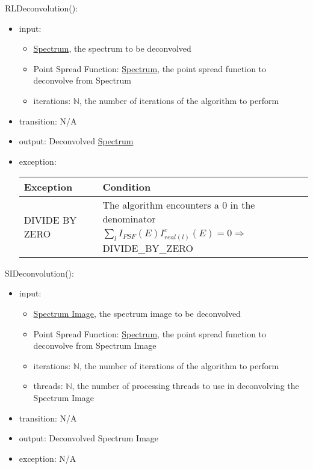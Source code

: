 \documentclass[12pt, titlepage]{article}
\begin{document}
\noindent RLDeconvolution():
\begin{itemize}
    \item input: 
        \begin{itemize}
            \item \hyperref[Mod:Spectrum]{Spectrum}, the spectrum to be deconvolved
            \item Point Spread Function: \hyperref[Mod:Spectrum]{Spectrum}, the point spread function to deconvolve from Spectrum
            \item iterations: $\mathbb{N}$, the number of iterations of the algorithm to perform
        \end{itemize}
    \item transition: N/A
    \item output: Deconvolved \hyperref[Mod:Spectrum]{Spectrum}
    \item exception:
    \begin{center}
        \begin{tabular}{p{3.5cm} p{12cm}}
            \toprule[0.15em]
            \textbf{Exception} & \textbf{Condition}\\
            \midrule[0.1em]
            \multirow{2}{0.25\textwidth}{DIVIDE BY ZERO} & The algorithm encounters a 0 in the denominator\\ 
            & $\sum_l{I_{PSF}(E)I_{real(l)}^c(E)} = 0 \Rightarrow$ DIVIDE\_BY\_ZERO\\ 
            \bottomrule[0.15em]
        \end{tabular}
    \end{center}
\end{itemize}

\noindent SIDeconvolution():
\begin{itemize}
    \item input: 
    \begin{itemize}
        \item \hyperref[Mod:SI]{Spectrum Image}, the spectrum image to be deconvolved
        \item Point Spread Function: \hyperref[Mod:Spectrum]{Spectrum}, the point spread function to deconvolve from Spectrum Image
        \item iterations: $\mathbb{N}$, the number of iterations of the algorithm to perform
        \item threads: $\mathbb{N}$, the number of processing threads to use in deconvolving the Spectrum Image
    \end{itemize}
    \item transition: N/A
    \item output: Deconvolved Spectrum Image
    \item exception: N/A
\end{itemize}
\end{document}
